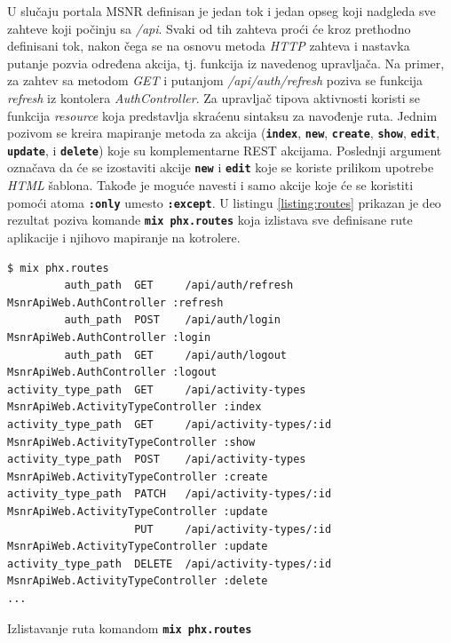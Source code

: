 \documentclass[12pt,oneside]{memoir}
\begin{document}
U slučaju portala MSNR definisan je jedan tok i jedan opseg koji nadgleda sve zahteve koji počinju sa \emph{/api}.
Svaki od tih zahteva proći će kroz prethodno definisani tok, nakon čega se na osnovu metoda \emph{HTTP} zahteva i nastavka
putanje pozvia određena akcija, tj. funkcija iz navedenog upravljača. Na primer, za zahtev sa metodom
\emph{GET} i putanjom \emph{/api/auth/refresh} poziva se funkcija \emph{refresh} iz kontolera 
\emph{AuthController}. Za upravljač tipova aktivnosti koristi se funkcija \emph{resource} koja
predstavlja skraćenu sintaksu za navođenje ruta. Jednim pozivom se kreira mapiranje metoda za akcija
(\texttt{\textbf{index}}, \texttt{\textbf{new}}, \texttt{\textbf{create}}, \texttt{\textbf{show}}, \texttt{\textbf{edit}},
\texttt{\textbf{update}}, i \texttt{\textbf{delete}}) koje su komplementarne REST akcijama. Poslednji argument označava da
će se izostaviti akcije \texttt{\textbf{new}} i \texttt{\textbf{edit}} koje se koriste prilikom upotrebe \emph{HTML} šablona. Takođe je moguće
navesti i samo akcije koje će se koristiti pomoći atoma \texttt{\textbf{:only}} umesto \texttt{\textbf{:except}}. U listingu \ref{listing:routes}
prikazan je deo rezultat poziva komande \texttt{\textbf{mix phx.routes}} koja izlistava sve definisane rute aplikacije i njihovo mapiranje na kotrolere.
\begin{listing}[!h]
  \begin{verbatim}
$ mix phx.routes
         auth_path  GET     /api/auth/refresh        MsnrApiWeb.AuthController :refresh
         auth_path  POST    /api/auth/login          MsnrApiWeb.AuthController :login
         auth_path  GET     /api/auth/logout         MsnrApiWeb.AuthController :logout
activity_type_path  GET     /api/activity-types      MsnrApiWeb.ActivityTypeController :index
activity_type_path  GET     /api/activity-types/:id  MsnrApiWeb.ActivityTypeController :show
activity_type_path  POST    /api/activity-types      MsnrApiWeb.ActivityTypeController :create
activity_type_path  PATCH   /api/activity-types/:id  MsnrApiWeb.ActivityTypeController :update
                    PUT     /api/activity-types/:id  MsnrApiWeb.ActivityTypeController :update
activity_type_path  DELETE  /api/activity-types/:id  MsnrApiWeb.ActivityTypeController :delete
...
\end{verbatim}
\caption{Izlistavanje ruta komandom \texttt{\textbf{mix phx.routes}}}
\label{listing:routes}
\end{listing}
\end{document}
